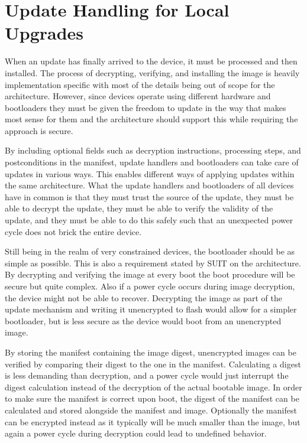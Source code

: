 \documentclass[0-thesis.tex]{subfiles}
\begin{document}
\section{Update Handling for Local Upgrades}
\label{sec:upgrading}
When an update has finally arrived to the device, it must be processed and then installed.
The process of decrypting, verifying, and installing the image is heavily implementation
specific with most of the details being out of scope for the architecture. However, since
devices operate using different hardware and bootloaders they must be given the freedom to
update in the way that makes most sense for them and the architecture should support this
while requiring the approach is secure.

By including optional fields such as decryption instructions, processing steps, and
postconditions in the manifest, update handlers and bootloaders can take care of updates
in various ways. This enables different ways of applying updates within the same
architecture. What the update handlers and bootloaders of all devices have in common is
that they must trust the source of the update, they must be able to decrypt the update,
they must be able to verify the validity of the update, and they must be able to do this
safely such that an unexpected power cycle does not brick the entire device.

Still being in the realm of very constrained devices, the bootloader should be as simple
as possible. This is also a requirement stated by SUIT on the architecture. By decrypting
and verifying the image at every boot the boot procedure will be secure but quite complex.
Also if a power cycle occurs during image decryption, the device might not be able to
recover. Decrypting the image as part of the update mechanism and writing it unencrypted
to flash would allow for a simpler bootloader, but is less secure as the device would boot
from an unencrypted image.

By storing the manifest containing the image digest, unencrypted images can be verified by
comparing their digest to the one in the manifest. Calculating a digest is less demanding
than decryption, and a power cycle would just interrupt the digest calculation instead of
the decryption of the actual bootable image. In order to make sure the manifest is correct
upon boot, the digest of the manifest can be calculated and stored alongside the manifest
and image. Optionally the manifest can be encrypted instead as it typically will be much
smaller than the image, but again a power cycle during decryption could lead to undefined
behavior.
\end{document}

